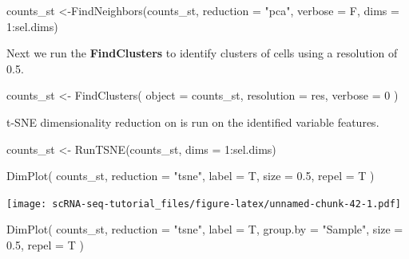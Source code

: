 \documentclass[
]{book}
\newenvironment{Shaded}{\begin{snugshade}}{\end{snugshade}}
\newcommand{\AttributeTok}[1]{\textcolor[rgb]{0.77,0.63,0.00}{#1}}
\newcommand{\DecValTok}[1]{\textcolor[rgb]{0.00,0.00,0.81}{#1}}
\newcommand{\FloatTok}[1]{\textcolor[rgb]{0.00,0.00,0.81}{#1}}
\newcommand{\FunctionTok}[1]{\textcolor[rgb]{0.00,0.00,0.00}{#1}}
\newcommand{\NormalTok}[1]{#1}
\newcommand{\OtherTok}[1]{\textcolor[rgb]{0.56,0.35,0.01}{#1}}
\newcommand{\SpecialCharTok}[1]{\textcolor[rgb]{0.00,0.00,0.00}{#1}}
\newcommand{\StringTok}[1]{\textcolor[rgb]{0.31,0.60,0.02}{#1}}
\begin{document}
\begin{Shaded}
\begin{Highlighting}[]
\NormalTok{counts\_st }\OtherTok{\textless{}{-}}\FunctionTok{FindNeighbors}\NormalTok{(counts\_st,}
                \AttributeTok{reduction =} \StringTok{"pca"}\NormalTok{,}
                \AttributeTok{verbose =}\NormalTok{ F,}
                \AttributeTok{dims =} \DecValTok{1}\SpecialCharTok{:}\NormalTok{sel.dims)}
\end{Highlighting}
\end{Shaded}

Next we run the \textbf{FindClusters} to identify clusters of cells using a resolution of 0.5.

\begin{Shaded}
\begin{Highlighting}[]
\NormalTok{counts\_st }\OtherTok{\textless{}{-}}
  \FunctionTok{FindClusters}\NormalTok{(}
    \AttributeTok{object =}\NormalTok{ counts\_st,}
    \AttributeTok{resolution =}\NormalTok{ res,}
    \AttributeTok{verbose =} \DecValTok{0}
\NormalTok{  )}
\end{Highlighting}
\end{Shaded}

t-SNE dimensionality reduction on is run on the identified variable features.

\begin{Shaded}
\begin{Highlighting}[]
\NormalTok{counts\_st }\OtherTok{\textless{}{-}} \FunctionTok{RunTSNE}\NormalTok{(counts\_st, }\AttributeTok{dims =} \DecValTok{1}\SpecialCharTok{:}\NormalTok{sel.dims)}
\end{Highlighting}
\end{Shaded}

\begin{Shaded}
\begin{Highlighting}[]
\FunctionTok{DimPlot}\NormalTok{(}
\NormalTok{  counts\_st,}
  \AttributeTok{reduction =} \StringTok{"tsne"}\NormalTok{,}
  \AttributeTok{label =}\NormalTok{ T,}
  \AttributeTok{size =} \FloatTok{0.5}\NormalTok{,}
  \AttributeTok{repel =}\NormalTok{ T}
\NormalTok{)}
\end{Highlighting}
\end{Shaded}

\texttt{[image: scRNA-seq-tutorial\_files/figure-latex/unnamed-chunk-42-1.pdf]}

\begin{Shaded}
\begin{Highlighting}[]
\FunctionTok{DimPlot}\NormalTok{(}
\NormalTok{  counts\_st,}
  \AttributeTok{reduction =} \StringTok{"tsne"}\NormalTok{,}
  \AttributeTok{label =}\NormalTok{ T,}
  \AttributeTok{group.by =} \StringTok{"Sample"}\NormalTok{,}
  \AttributeTok{size =} \FloatTok{0.5}\NormalTok{,}
  \AttributeTok{repel =}\NormalTok{ T}
\NormalTok{)}
\end{Highlighting}
\end{Shaded}
\end{document}
